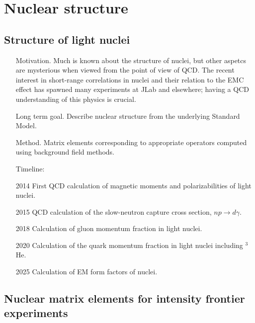 \documentclass{article}
\begin{document}
\section{Nuclear structure}\label{sec:nucstruct}

\subsection{Structure of light nuclei}

\begin{itemize}  
    \item[Motivation.] Much is known about the structure of nuclei, but other aspetcs are mysterious when viewed from the point of view of QCD. The recent interest in short-range correlations in nuclei and their relation to the EMC effect has spawned many experiments at JLab and elsewhere; having a QCD understanding of this physics is crucial. 
    
    \item[Long term goal.] Describe nuclear structure from the underlying Standard Model. 
    
    \item[Method.] Matrix elements corresponding to appropriate operators computed using background field methods.
      
\item[Timeline:]
    \item[2014] First QCD calculation of magnetic moments and polarizabilities of light nuclei.
    \item[2015] QCD calculation of the slow-neutron capture cross section, $np\to d\gamma$.
\item[2018] Calculation of gluon momentum fraction in light nuclei.
    \item[2020] Calculation of the quark momentum fraction in light nuclei including $^3$He. 
    \item[2025] Calculation of EM form factors of nuclei.
\end{itemize}

\subsection{Nuclear matrix elements for intensity frontier experiments}
\end{document}

